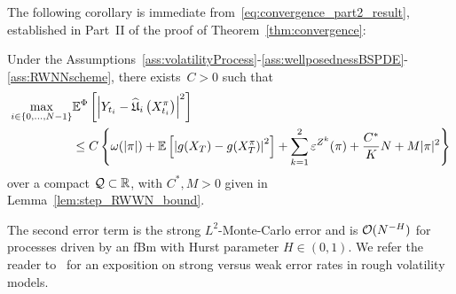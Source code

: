 The following corollary is immediate from~\eqref{eq:convergence_part2_result}, established in Part~II of the proof of Theorem~\ref{thm:convergence}:

\begin{corollary}\label{cor:convergence}
    Under the Assumptions~\ref{ass:volatilityProcess}-\ref{ass:wellposednessBSPDE}-\ref{ass:RWNNscheme},
    there exists~${C>0}$ such that
    \begin{align*}
    \max _{i\in\{0, \dots, N-1\}} & \mathbb{E}^\Phi\left[\left|Y_{t_i}-\widehat{\mathfrak{U}}_i\left(X^\pi_{t_i}\right)\right|^2\right] \\ & \leq C\left\{\omega(|\pi|) + \mathbb{E}\left[\left|g(X_T)-g(X^{\pi}_{T})\right|^2\right]+\sum_{k=1}^2\varepsilon^{Z^k}(\pi)+\frac{C^{*}}{K}N+ M|\pi|^2\right\}
    \end{align*}
    over a compact $\mathcal{Q}\subset \mathbb{R}$, with $C^*, M>0$ given in Lemma~\ref{lem:step_RWWN_bound}.
\end{corollary}

\begin{remark}
The second error term is the strong $L^2$-Monte-Carlo error and is $\mathcal{O}(N^{-H})$ for processes driven by an fBm with Hurst parameter $H\in(0, 1)$. 
We refer the reader to~\cite{Bonesini2023RoughConvergence, Gassiat2023WeakVolatility} for an exposition on strong versus weak error rates in rough volatility models.
\end{remark}


